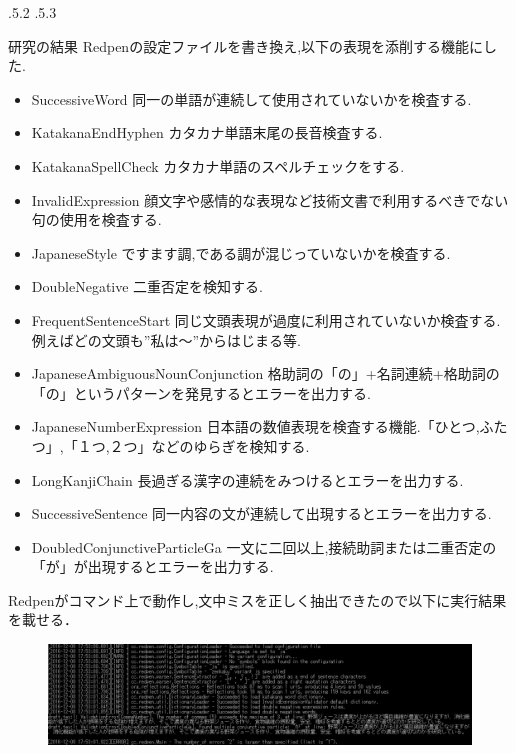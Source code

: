 \documentclass[uplatex]{jsarticle}
\makeatletter
\renewcommand{\section}{%
    \if@slide\clearpage\fi
    \@startsection{section}{1}{\z@}%
    {\Cvs \@plus.5\Cdp \@minus.2\Cdp}%
    {.5\Cvs \@plus.3\Cdp}%
    {\normalfont\raggedright}}
\makeatother
\begin{document}
\section{研究の結果}
Redpenの設定ファイルを書き換え,以下の表現を添削する機能にした.
\begin{itemize}
 \item SuccessiveWord 同一の単語が連続して使用されていないかを検査する.
 \item KatakanaEndHyphen カタカナ単語末尾の長音検査する.
 \item KatakanaSpellCheck カタカナ単語のスペルチェックをする.
 \item InvalidExpression 顔文字や感情的な表現など技術文書で利用するべきでない句の使用を検査する.
 \item JapaneseStyle ですます調,である調が混じっていないかを検査する.
 \item DoubleNegative 二重否定を検知する.
 \item FrequentSentenceStart 同じ文頭表現が過度に利用されていないか検査する.例えばどの文頭も”私は〜”からはじまる等.
 \item JapaneseAmbiguousNounConjunction 格助詞の「の」+名詞連続+格助詞の「の」というパターンを発見するとエラーを出力する.
 \item JapaneseNumberExpression 日本語の数値表現を検査する機能.「ひとつ,ふたつ」,「１つ,２つ」などのゆらぎを検知する.
 \item LongKanjiChain 長過ぎる漢字の連続をみつけるとエラーを出力する.
 \item SuccessiveSentence 同一内容の文が連続して出現するとエラーを出力する.
 \item DoubledConjunctiveParticleGa 一文に二回以上,接続助詞または二重否定の「が」が出現するとエラーを出力する.
\end{itemize}

Redpenがコマンド上で動作し,文中ミスを正しく抽出できたので以下に実行結果を載せる．

\begin{figure}[htb]
\centering
\includegraphics[width=16cm,clip]{image1.png}
\caption{}\label{サンプル図}
\end{figure}
\end{document}
